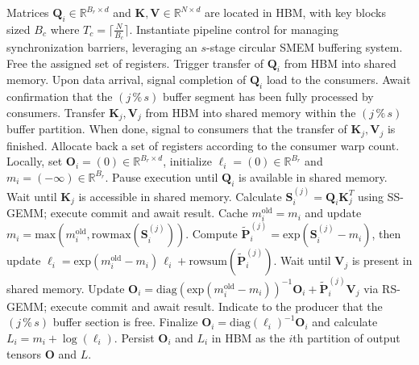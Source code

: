 \begin{algorithm}[H]
    \caption{\small\label{alg:flash3_wgmma_ws_only}\textsc{FlashAttention-3} forward pass \textbf{excluding} intra-consumer overlap -- CTA-level perspective}
    \begin{algorithmic}[1]
\REQUIRE Matrices $\mathbf{Q}_i \in \mathbb{R}^{B_r \times d}$ and $\mathbf{K}, \mathbf{V} \in \mathbb{R}^{N \times d}$ are located in HBM, with key blocks sized $B_c$ where $T_c = \lceil \frac{N}{B_c} \rceil$.
\STATE Instantiate pipeline control for managing synchronization barriers, leveraging an $s$-stage circular SMEM buffering system.
\STATE Free the assigned set of registers.
\STATE Trigger transfer of $\mathbf{Q}_i$ from HBM into shared memory.
\STATE Upon data arrival, signal completion of $\mathbf{Q}_i$ load to the consumers.
    \STATE Await confirmation that the $(j\,\%\,s)$ buffer segment has been fully processed by consumers.
    \STATE Transfer $\mathbf{K}_j, \mathbf{V}_j$ from HBM into shared memory within the $(j\,\%\,s)$ buffer partition.
    \STATE When done, signal to consumers that the transfer of $\mathbf{K}_j, \mathbf{V}_j$ is finished.
\ENDFOR
\ELSE \STATE Allocate back a set of registers according to the consumer warp count.
\STATE Locally, set $\mathbf{O}_i = (0) \in \mathbb{R}^{B_r \times d}$, initialize $\ell_i = (0) \in \mathbb{R}^{B_r}$ and $m_i = (-\infty) \in \mathbb{R}^{B_r}$.
\STATE Pause execution until $\mathbf{Q}_i$ is available in shared memory.
\STATE Wait until $\mathbf{K}_j$ is accessible in shared memory.
\STATE Calculate $\mathbf{S}_i^{(j)} = \mathbf{Q}_i \mathbf{K}_j^T$ using SS-GEMM; execute commit and await result. \label{alg:ws_only_gemm1}
\STATE Cache $m_i^{\mathrm{old}} = m_i$ and update $m_i = \mathrm{max}(m_i^{\mathrm{old}}, \mathrm{rowmax}(\mathbf{S}_i^{(j)}))$. \label{code-ws:softmax_start}
\STATE Compute $\widetilde{\mathbf{P}}_i^{(j)} = \mathrm{exp}(\mathbf{S}_i^{(j)} - m_i)$, then update $\ell_i = \mathrm{exp}(m_i^{\mathrm{old}} - m_i)\,\ell_i + \mathrm{rowsum}(\widetilde{\mathbf{P}}_i^{(j)})$. \label{code-ws:softmax_end}
\STATE Wait until $\mathbf{V}_j$ is present in shared memory.
\STATE Update $\mathbf{O}_i = \mathrm{diag}(\mathrm{exp}(m_i^{\mathrm{old}} - m_i))^{-1}\mathbf{O}_i + \widetilde{\mathbf{P}}_i^{(j)} \mathbf{V}_j$ via RS-GEMM; execute commit and await result. \label{alg:ws_only_gemm2}
\STATE Indicate to the producer that the $(j\,\%\,s)$ buffer section is free.
\ENDFOR
\STATE Finalize $\mathbf{O}_i = \mathrm{diag}(\ell_i)^{-1} \mathbf{O}_i$ and calculate $L_i = m_i + \log(\ell_i)$.
\STATE Persist $\mathbf{O}_i$ and $L_i$ in HBM as the $i$th partition of output tensors $\mathbf{O}$ and $L$.
\ENDIF
\end{algorithmic}
\end{algorithm}

